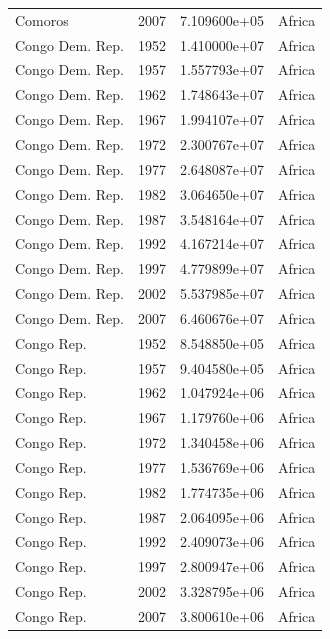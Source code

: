 \documentclass[
  letterpaper,
  DIV=11,
  numbers=noendperiod]{scrreprt}
\begin{document}
\begin{tcolorbox}
\begin{tabular}{lrrl}
Comoros                  &  2007 &  7.109600e+05 &    Africa \\
Congo Dem. Rep.          &  1952 &  1.410000e+07 &    Africa \\
Congo Dem. Rep.          &  1957 &  1.557793e+07 &    Africa \\
Congo Dem. Rep.          &  1962 &  1.748643e+07 &    Africa \\
Congo Dem. Rep.          &  1967 &  1.994107e+07 &    Africa \\
Congo Dem. Rep.          &  1972 &  2.300767e+07 &    Africa \\
Congo Dem. Rep.          &  1977 &  2.648087e+07 &    Africa \\
Congo Dem. Rep.          &  1982 &  3.064650e+07 &    Africa \\
Congo Dem. Rep.          &  1987 &  3.548164e+07 &    Africa \\
Congo Dem. Rep.          &  1992 &  4.167214e+07 &    Africa \\
Congo Dem. Rep.          &  1997 &  4.779899e+07 &    Africa \\
Congo Dem. Rep.          &  2002 &  5.537985e+07 &    Africa \\
Congo Dem. Rep.          &  2007 &  6.460676e+07 &    Africa \\
Congo Rep.               &  1952 &  8.548850e+05 &    Africa \\
Congo Rep.               &  1957 &  9.404580e+05 &    Africa \\
Congo Rep.               &  1962 &  1.047924e+06 &    Africa \\
Congo Rep.               &  1967 &  1.179760e+06 &    Africa \\
Congo Rep.               &  1972 &  1.340458e+06 &    Africa \\
Congo Rep.               &  1977 &  1.536769e+06 &    Africa \\
Congo Rep.               &  1982 &  1.774735e+06 &    Africa \\
Congo Rep.               &  1987 &  2.064095e+06 &    Africa \\
Congo Rep.               &  1992 &  2.409073e+06 &    Africa \\
Congo Rep.               &  1997 &  2.800947e+06 &    Africa \\
Congo Rep.               &  2002 &  3.328795e+06 &    Africa \\
Congo Rep.               &  2007 &  3.800610e+06 &    Africa \\

\end{tabular}
\end{tcolorbox}
\end{document}
